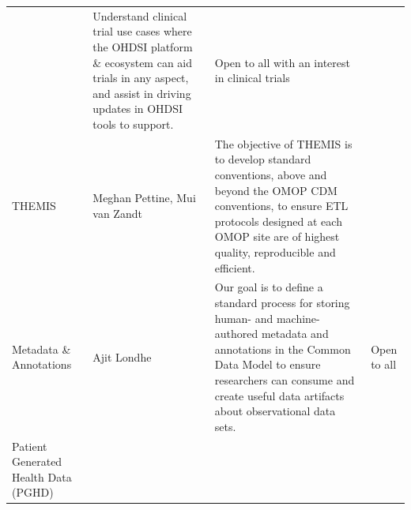 \documentclass[11pt]{book}
\theoremstyle{definition}
\theoremstyle{definition}
\theoremstyle{definition}
\theoremstyle{remark}
\begin{document}
\begin{longtable}[]{@{}llll@{}}
\begin{minipage}[t]{0.22\columnwidth}
\end{minipage} & \begin{minipage}[t]{0.22\columnwidth}\raggedright
Understand clinical trial use cases where the OHDSI platform \& ecosystem can aid trials in any aspect, and assist in driving updates in OHDSI tools to support.\strut
\end{minipage} & \begin{minipage}[t]{0.22\columnwidth}\raggedright
Open to all with an interest in clinical trials\strut
\end{minipage}\tabularnewline
\begin{minipage}[t]{0.22\columnwidth}\raggedright
THEMIS\strut
\end{minipage} & \begin{minipage}[t]{0.22\columnwidth}\raggedright
Meghan Pettine, Mui van Zandt\strut
\end{minipage} & \begin{minipage}[t]{0.22\columnwidth}\raggedright
The objective of THEMIS is to develop standard conventions, above and beyond the OMOP CDM conventions, to ensure ETL protocols designed at each OMOP site are of highest quality, reproducible and efficient.\strut
\end{minipage} & \begin{minipage}[t]{0.22\columnwidth}\raggedright
\strut
\end{minipage}\tabularnewline
\begin{minipage}[t]{0.22\columnwidth}\raggedright
Metadata \& Annotations\strut
\end{minipage} & \begin{minipage}[t]{0.22\columnwidth}\raggedright
Ajit Londhe\strut
\end{minipage} & \begin{minipage}[t]{0.22\columnwidth}\raggedright
Our goal is to define a standard process for storing human- and machine-authored metadata and annotations in the Common Data Model to ensure researchers can consume and create useful data artifacts about observational data sets.\strut
\end{minipage} & \begin{minipage}[t]{0.22\columnwidth}\raggedright
Open to all\strut
\end{minipage}\tabularnewline
\begin{minipage}[t]{0.22\columnwidth}\raggedright
Patient Generated Health Data (PGHD)\strut
\end{minipage} & \begin{minipage}[t]{0.22\columnwidth}\raggedright

\end{minipage}
\end{longtable}
\end{document}
